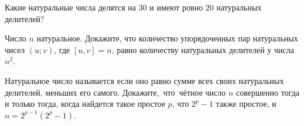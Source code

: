 \documentclass[a4paper,11pt]{article}
\begin{document}
Какие натуральные числа делятся на 30 и имеют ровно
20 натуральных делителей?


 Число $n$ натуральное. %
Докажите, что количество упорядоченных пар натуральных
чисел $(u;v)$, где $[u,v]=n$, равно количеству
натуральных делителей у числа $n^2$.


 Натуральное число называется 
если оно равно сумме всех своих натуральных делителей, меньших его самого.
Докажите,~что~ч\"етное число $n$ совершенно
тогда и только тогда, когда  найдется такое простое $p$,
что $2^p-1$ также простое, и $n=2^{p-1}(2^p-1)$.


\end{document}
